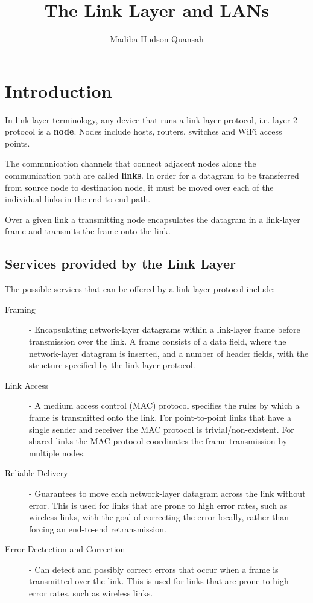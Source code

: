 \documentclass[12pt letter]{report}
\title{\Huge{The Link Layer and LANs}}
\author{\huge{Madiba Hudson-Quansah}}
\date{}
\begin{document}
\maketitle
\newpage
{}
\tableofcontents
\pagebreak

\chapter{Introduction}

In link layer terminology, any device that runs a link-layer
protocol, i.e. layer 2 protocol is a \textbf{node}. Nodes include
hosts, routers, switches and WiFi access points.

The communication channels that connect adjacent nodes along the
communication path are called \textbf{links}. In order for a datagram
to be transferred from source node to destination node, it must be
moved over each of the individual links in the end-to-end path.

Over a given link a transmitting node encapsulates the datagram in a
link-layer frame and transmits the frame onto the link.

\section{Services provided by the Link Layer}

The possible services that can be offered by a link-layer protocol include:
\begin{description}
  \item[Framing]  - Encapsulating network-layer datagrams within a
    link-layer frame before transmission over the link. A frame
    consists of a data field, where the network-layer datagram is
    inserted,  and a number of header fields, with the structure
    specified by the link-layer protocol.
  \item[Link Access] - A medium access control (MAC) protocol
    specifies the rules by which a frame is transmitted onto the
    link. For point-to-point links that have a single sender and
    receiver the MAC protocol is trivial/non-existent. For shared
    links the MAC protocol coordinates the frame transmission by multiple nodes.
  \item[Reliable Delivery] - Guarantees to move each network-layer
    datagram across the link without error. This is used for links
    that are prone to high error rates, such as wireless links, with
    the goal of correcting the error locally, rather than forcing an
    end-to-end retransmission.
  \item[Error Dectection and Correction ] - Can detect and possibly
    correct errors that occur when a frame is
    transmitted over the link. This is used for links that are
    prone to high error rates, such as wireless links.
\end{description}
\end{document}
